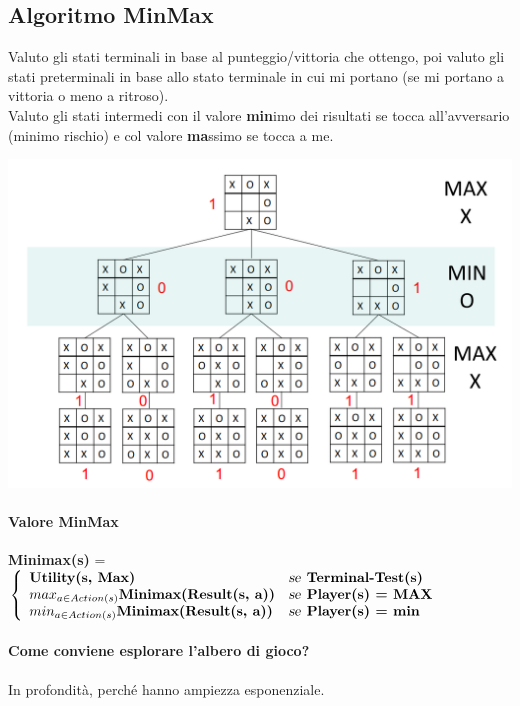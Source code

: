 \documentclass[10pt]{book}
\begin{document}
\subsection{Algoritmo MinMax}
Valuto gli stati terminali in base al punteggio/vittoria che ottengo, poi valuto gli stati preterminali in base allo stato terminale in cui mi portano (se mi portano a vittoria o meno a ritroso).\\
Valuto gli stati intermedi con il valore \textbf{min}imo dei risultati se tocca all'avversario (minimo rischio) e col valore \textbf{ma}ssimo se tocca a me.
\begin{center}
	\includegraphics[scale=0.45]{minmax_tictactoe.png}
\end{center}
\paragraph{Valore MinMax} \textbf{Minimax(s)} = 
\begin{math}
\left\{
\begin{array}{l l}
	\textbf{Utility(s, Max)} & \textsl{se}\:\:\textbf{Terminal-Test(s)}\\
	max_{a \in Action(s)} \textbf{Minimax(Result(s, a))} & \textsl{se}\:\: \textbf{Player(s) = MAX}\\
	min_{a \in Action(s)} \textbf{Minimax(Result(s, a))} & \textsl{se}\:\: \textbf{Player(s) = min}
\end{array}
\right.
\end{math}
\paragraph{Come conviene esplorare l'albero di gioco?} In profondità, perché hanno ampiezza esponenziale.
\pagebreak
\end{document}
